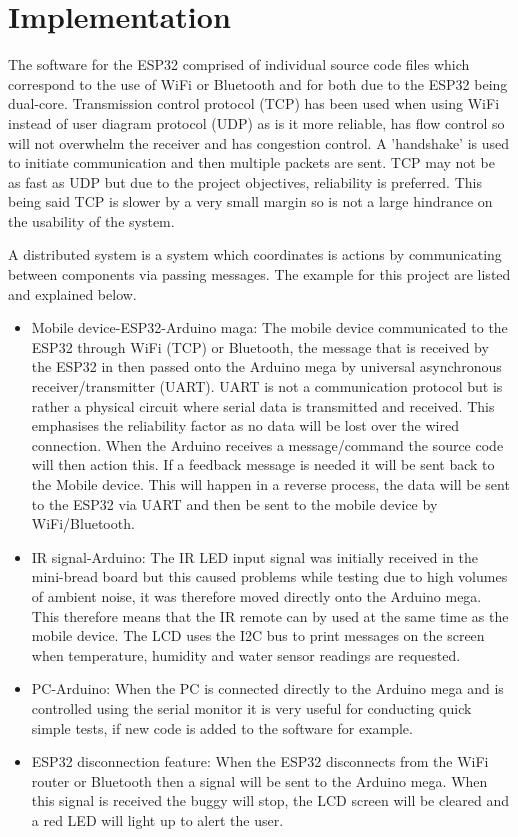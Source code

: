 \documentclass[8pt, a4paper]{article}
\begin{document}
\section{Implementation}

The software for the ESP32 comprised of individual source code files which correspond to the use of WiFi or Bluetooth and for both due to the ESP32 being dual-core. Transmission control protocol (TCP) has been used when using WiFi instead of user diagram protocol (UDP) as is it more reliable, has flow control so will not overwhelm the receiver and has congestion control. A 'handshake' is used to initiate communication and then multiple packets are sent. TCP may not be as fast as UDP but due to the project objectives, reliability is preferred. This being said TCP is slower by a very small margin so is not a large hindrance on the usability of the system. 


A distributed system is a system which coordinates is actions by communicating between components via passing messages. The example for this project are listed and explained below.

\begin{itemize}
	\item Mobile device-ESP32-Arduino maga: The mobile device communicated to the ESP32 through WiFi (TCP) or Bluetooth, the message that is received by the ESP32 in then passed onto the Arduino mega by universal asynchronous receiver/transmitter (UART). UART is not a communication protocol but is rather a physical circuit where serial data is transmitted and received. This emphasises the reliability factor as no data will be lost over the wired connection. When the Arduino receives a message/command the source code will then action this. If a feedback message is needed it will be sent back to the Mobile device. This will happen in a reverse process, the data will be sent to the ESP32 via UART and then be sent to the mobile device by WiFi/Bluetooth. 
	\item IR signal-Arduino: The IR LED input signal was initially received in the mini-bread board but this caused problems while testing due to high volumes of ambient noise, it was therefore moved directly onto the Arduino mega. This therefore means that the IR remote can by used at the same time as the mobile device. The LCD uses the I2C bus to print messages on the screen when temperature, humidity and water sensor readings are requested. 
	\item  PC-Arduino: When the PC is connected directly to the Arduino mega and is controlled using the serial monitor it is very useful for conducting quick simple tests, if new code is added to the software for example. 
	\item ESP32 disconnection feature: When the ESP32 disconnects from the WiFi router or Bluetooth then a signal will be sent to the Arduino mega. When this signal is received the buggy will stop, the LCD screen will be cleared and a red LED will light up to alert the user. 
\end{itemize} 
\end{document}
